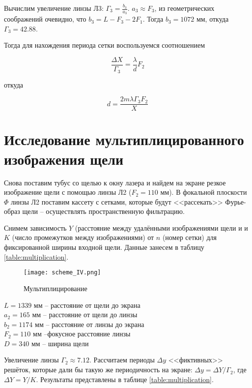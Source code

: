 	Вычислим увеличение линзы Л3: $\Gamma_3 = \frac{b_3}{a_3}$. $a_3 \approx F_3$, из геометрических соображений очевидно, что $b_3 = L - F_3 - 2F_1$. Тогда $b_3 = 1072$ мм, откуда $\Gamma_3 = 42.88$.
	
	Тогда для нахождения периода сетки воспользуемся соотношением
	
	\begin{equation}
		\frac{\Delta X}{\Gamma_3} = \frac{\lambda}{d} F_2
	\end{equation}
	
	откуда
	
	\[ d = \frac{2 m \lambda \Gamma_3 F_2}{X} \]

    \section{Исследование мультиплицированного изображения щели}
    
    Снова поставим тубус со щелью к окну лазера и найдем на экране резкое изображение щели с помощью линзы Л2 ($F_2 = 110$ мм). В фокальной плоскости $\Phi$ линзы Л2 поставим кассету с сетками, которые будут <<рассекать>> Фурье-образ щели -- осуществлять пространственную фильтрацию.
    
    Снимем зависимость $Y$ (расстояние между удалёнными изображениями щели и и $K$ (число промежутков между изображениями) от $n$ (номер сетки) для фиксированной ширины входной щели. Данные занесем в таблицу \ref{table:multiplication}.
    
    
    
    \begin{figure}
    	\centering
    	\texttt{[image: scheme\_IV.png]}
    	\caption{Мультиплицирование}
    \end{figure}

	\begin{center}
		$L = 1339$ мм -- расстояние от щели до экрана \\
		$a_2 = 165$ мм -- расстояние от щели до линзы \\
		$b_2 = 1174$ мм -- расстояние от линзы до экрана \\
		$F_2 = 110$ мм --фокусное расстояние линзы \\
		$D = 340$ мм -- ширина щели
	\end{center}

	Увеличение линзы $\Gamma_2 \approx 7.12$. Рассчитаем периоды $\Delta y$ <<фиктивных>> решёток, которые дали бы такую же периодичность на экране: $\Delta y=\Delta Y / \Gamma_{2}$, где $\Delta Y=Y / K .$ Результаты представлены в таблице \ref{table:multiplication}.
	
